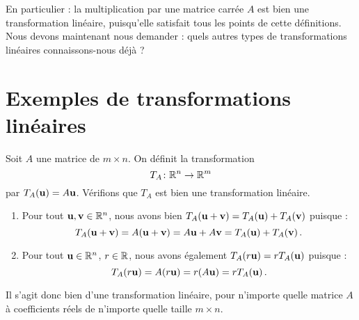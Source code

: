En particulier : la multiplication par une matrice carrée $A$ est bien une transformation linéaire, puisqu'elle satisfait tous les points de cette définitions.\\

Nous devons maintenant nous demander : quels autres types de transformations linéaires
connaissons-nous déjà ?



\section{Exemples de transformations linéaires}

\begin{myexample}\label{ex:multmatlintrans}
 Soit $A$ une matrice de $m\times n$.  On définit la transformation
$$T_A \colon \mathbb{R}^n \to \mathbb{R}^m
$$
par $T_A(\mathbf{u}) = A\mathbf{u}$.  Vérifions que $T_A$ est bien une transformation linéaire.
\begin{enumerate}
\item Pour tout $\mathbf{u},\mathbf{v} \in \mathbb{R}^n$, nous avons bien $T_A(\mathbf{u}+\mathbf{v}) = T_A(\mathbf{u}) +T_A(\mathbf{v})$ puisque :
$$
T_A(\mathbf{u}+\mathbf{v}) = A(\mathbf{u} + \mathbf{v}) = A\mathbf{u} + A\mathbf{v} =  T_A(\mathbf{u}) +T_A(\mathbf{v})\,.
$$
\item Pour tout $\mathbf{u} \in \mathbb{R}^n$, $r\in \mathbb{R}$, nous avons également $T_A(r\mathbf{u}) = rT_A(\mathbf{u})$ puisque :
$$
T_A(r\mathbf{u}) = A(r\mathbf{u}) = r(A\mathbf{u}) = rT_A(\mathbf{u})\,.
$$
\end{enumerate}
Il s'agit donc bien d'une transformation linéaire, pour n'importe quelle matrice $A$ à coefficients réels de n'importe quelle taille $m\times n$.
\end{myexample}

